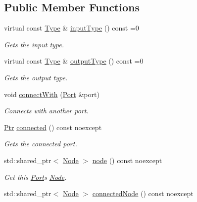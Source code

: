 \subsection*{Public Member Functions}
\begin{DoxyCompactItemize}
\item 
virtual const \hyperlink{classdg_1_1deepcore_1_1_type}{Type} \& \hyperlink{classdg_1_1deepcore_1_1_port_a3d6b88028f1698d5c7d7465da5e52063}{input\+Type} () const =0
\begin{DoxyCompactList}\small\item\em Gets the input type. \end{DoxyCompactList}\item 
virtual const \hyperlink{classdg_1_1deepcore_1_1_type}{Type} \& \hyperlink{classdg_1_1deepcore_1_1_port_a7ec3662ee7ede6e5a241fa69c73facf2}{output\+Type} () const =0
\begin{DoxyCompactList}\small\item\em Gets the output type. \end{DoxyCompactList}\item 
void \hyperlink{classdg_1_1deepcore_1_1_port_ae09223b25061e685b9a58e543081241a}{connect\+With} (\hyperlink{classdg_1_1deepcore_1_1_port}{Port} \&port)
\begin{DoxyCompactList}\small\item\em Connects with another port. \end{DoxyCompactList}\item 
\hyperlink{classdg_1_1deepcore_1_1_object_a4565c5c2ba828aaaa4354befbac8b2f9}{Ptr} \hyperlink{classdg_1_1deepcore_1_1_port_a502a59710524cd8105968c2755e950ff}{connected} () const noexcept
\begin{DoxyCompactList}\small\item\em Gets the connected port. \end{DoxyCompactList}\item 
std\+::shared\+\_\+ptr$<$ \hyperlink{classdg_1_1deepcore_1_1_node}{Node} $>$ \hyperlink{classdg_1_1deepcore_1_1_port_a18b19866548cbd798c7899cca98d1c43}{node} () const noexcept
\begin{DoxyCompactList}\small\item\em Get this \hyperlink{classdg_1_1deepcore_1_1_port}{Port}\textquotesingle{}s \hyperlink{classdg_1_1deepcore_1_1_node}{Node}. \end{DoxyCompactList}\item 
std\+::shared\+\_\+ptr$<$ \hyperlink{classdg_1_1deepcore_1_1_node}{Node} $>$ \hyperlink{classdg_1_1deepcore_1_1_port_aa0d92fbc0fd6c1b11ebd87ba715418f4}{connected\+Node} () const noexcept

\end{DoxyCompactItemize}
